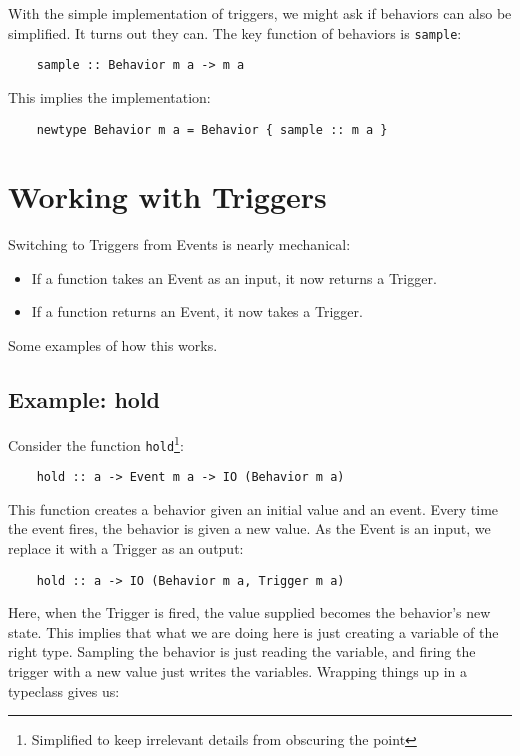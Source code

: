 \documentclass{article}
\begin{document}
With the simple implementation of triggers, we might ask if behaviors
can also be simplified.  It turns out they can.  The key function of
behaviors is \verb|sample|:

\begin{verbatim}
    sample :: Behavior m a -> m a
\end{verbatim}

This implies the implementation:

\begin{verbatim}
    newtype Behavior m a = Behavior { sample :: m a }
\end{verbatim}

\section{Working with Triggers}

Switching to Triggers from Events is nearly mechanical:

\begin{itemize}
\item If a function takes an Event as an input, it now returns a
Trigger.
\item If a function returns an Event, it now takes a Trigger.
\end{itemize}

Some examples of how this works.

\subsection{Example: hold}

Consider the function \verb|hold|\footnote{Simplified to keep irrelevant
details from obscuring the point}:

\begin{verbatim}
    hold :: a -> Event m a -> IO (Behavior m a)
\end{verbatim}

This function creates a behavior given an initial value and an event.
Every time the event fires, the behavior is given a new value.  As the
Event is an input, we replace it with a Trigger as an output:

\begin{verbatim}
    hold :: a -> IO (Behavior m a, Trigger m a)
\end{verbatim}

Here, when the Trigger is fired, the value supplied becomes the
behavior's new state.  This implies that what we are doing here is just
creating a variable of the right type.  Sampling the behavior is just
reading the variable, and firing the trigger with a new value just
writes the variables.  Wrapping things up in a typeclass gives us:
\end{document}
